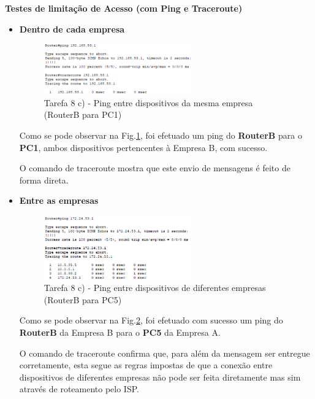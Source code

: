 \documentclass[11pt,english, openright, oneside]{book}
\begin{document}
\pagebreak
\large
\textbf{Testes de limitação de Acesso (com Ping e Traceroute)} \par
\normalsize
\begin{itemize}
    \item \textbf{Dentro de cada empresa}
    \begin{figure}[H]
        \centering
        \includegraphics[width=0.6\textwidth]{imagens/Tarefa8/8.c_empresa.png}
        \caption{Tarefa 8 c) - Ping entre dispositivos da mesma empresa (RouterB para PC1)}
        \label{fig:8.c_empresa}
    \end{figure}
    
    Como se pode observar na Fig.\ref{fig:8.c_empresa}, foi efetuado um ping do \textbf{RouterB} para o \textbf{PC1}, ambos dispositivos pertencentes à Empresa B, com sucesso. \par 
    O comando de traceroute mostra que este envio de mensagens é feito de forma direta. \par

    \vspace{1.2cm}
    \item \textbf{Entre as empresas}
    \begin{figure}[H]
        \centering
        \includegraphics[width=0.6\textwidth]{imagens/Tarefa8/8.c_empresas.png}
        \caption{Tarefa 8 c) - Ping entre dispositivos de diferentes empresas (RouterB para PC5)}
        \label{fig:8.c_empresas}
    \end{figure}

    Como se pode observar na Fig.\ref{fig:8.c_empresas}, foi efetuado com sucesso um ping do \textbf{RouterB} da Empresa B para o \textbf{PC5} da Empresa A. \par 
    O comando de traceroute confirma que, para além da mensagem ser entregue corretamente, esta segue as regras impostas de que a conexão entre dispositivos de diferentes empresas não pode ser feita diretamente mas sim através de roteamento pelo ISP. \par


\end{itemize}
\end{document}
